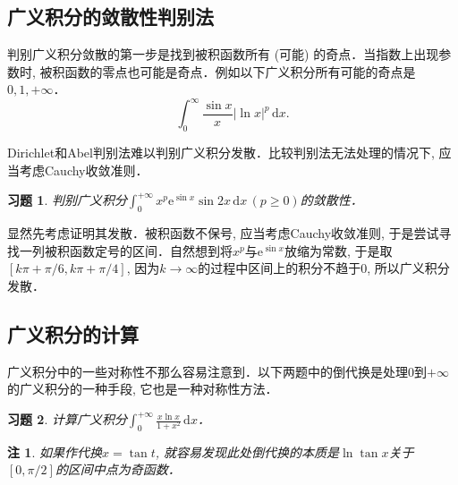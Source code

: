 \documentclass[11pt,a4paper]{ctexart}
\makeatletter
\theoremstyle{thmseries} %
\theoremstyle{exerseries}
\newtheorem{exer}{习题}[section]
\newtheorem*{rem}{注}
\renewenvironment{proof}[1][\proofname]{\par
  \pushQED{\qed}%
  \normalfont \topsep6\p@\@plus6\p@\relax
  \trivlist
  \item[\hskip\labelsep
        \itshape
    #1\@addpunct{}]\ignorespaces
}{%
  \popQED\endtrivlist\@endpefalse
}
\newenvironment{sol}{\begin{proof}[\bfseries\upshape 解\quad]}{\end{proof}}
\newcommand{\bra}[1]{\mathopen{}\left(#1\right)}
\newcommand{\sbra}[1]{\mathopen{}\left[#1\right]}
\newcommand{\R}{\mathbb{R}}
\renewcommand{\d}{\mathrm{d}}
\newcommand{\e}{\mathrm{e}}
\makeatother
\begin{document}
\subsection{广义积分的敛散性判别法}
判别广义积分敛散的第一步是找到被积函数所有 (可能) 的奇点．当指数上出现参数时, 被积函数的零点也可能是奇点．例如以下广义积分所有可能的奇点是$0,1,+\infty$．
\[\int_{0}^{\infty}\frac{\sin x}{x}|\ln x|^p\,\d x.\]



Dirichlet和Abel判别法难以判别广义积分发散．比较判别法无法处理的情况下, 应当考虑Cauchy收敛准则．
\begin{exer}
	判别广义积分$\int_{0}^{+\infty}x^p\e^{\sin x}\sin 2x\,\d x\,(p\geq0)$的敛散性．
\end{exer}
\begin{sol}
	显然先考虑证明其发散．被积函数不保号, 应当考虑Cauchy收敛准则, 于是尝试寻找一列被积函数定号的区间．自然想到将$x^p$与$\e^{\sin x}$放缩为常数, 于是取$[k\pi+\pi/6,k\pi+\pi/4]$, 因为$k\to\infty$的过程中区间上的积分不趋于$0$, 所以广义积分发散．
\end{sol}


\subsection{广义积分的计算}
广义积分中的一些对称性不那么容易注意到．以下两题中的倒代换是处理$0$到$+\infty$的广义积分的一种手段, 它也是一种对称性方法．
\begin{exer}
	计算广义积分$\int_{0}^{+\infty}\frac{x\ln x}{1+x^2}\,\d x$．
\end{exer}
\begin{rem}
	如果作代换$x=\tan t$, 就容易发现此处倒代换的本质是$\ln\tan x$关于$[0,\pi/2]$的区间中点为奇函数．
\end{rem}
\end{document}
